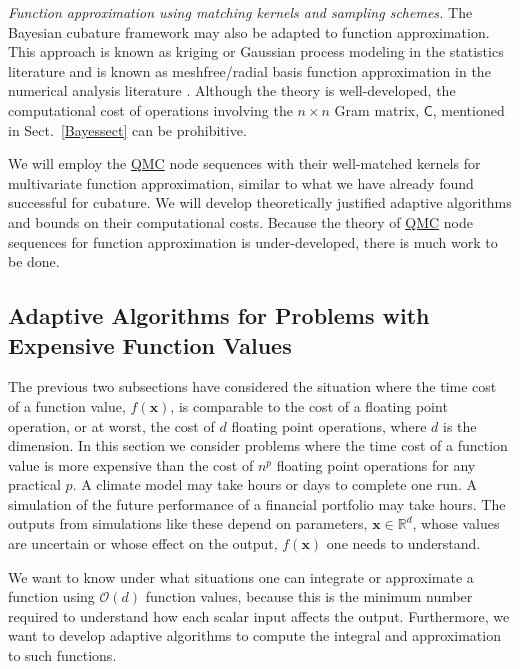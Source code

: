 \documentclass[11pt]{NSFamsart}
\newcommand{\QMC}{\hyperlink{QMClink}{QMC}\xspace}
\newcommand{\reals}{{\mathbb{R}}}
\newcommand{\mC}{\mathsf{C}}
\newcommand{\bx}{{\boldsymbol{x}}}
\newcommand{\Order}{\mathcal{O}}
\begin{document}
\emph{Function approximation using matching kernels and sampling schemes.}
The Bayesian cubature framework may also be adapted to function approximation.  This approach is 
known as kriging or Gaussian process modeling in the statistics literature \cite{RasWil06a,Ste99} 
and is known as meshfree/radial basis function 
approximation in the 
numerical analysis literature \cite{Fas07a,FasMcC15a,Wen05a}.  Although the theory is 
well-developed, the computational cost of operations involving the $n \times n$ Gram matrix, 
$\mC$, mentioned in Sect.\ \ref{Bayessect} can be prohibitive.  

We will employ the \QMC node sequences with their well-matched kernels for multivariate function 
approximation, similar to what  we 
have already found successful for cubature.  We will 
develop theoretically justified adaptive algorithms and bounds on their computational costs.  
Because the theory of \QMC node sequences for function approximation is under-developed, there 
is much work to be done.

\subsection{Adaptive Algorithms for Problems with Expensive Function Values} 
\label{SectExpensive}
The previous two subsections have considered the situation where the time cost of a function value, 
$f(\bx)$, is comparable to the cost of a floating point operation, or at worst, the cost of $d$ floating 
point 
operations, where $d$ is the dimension.  In this section we consider problems where the time cost 
of a function value is more expensive than the cost of $n^p$ floating point operations for any 
practical $p$.  A climate model may take hours or days to complete one run.  A simulation of the 
future performance of a financial portfolio may take hours.  The outputs from simulations like these 
depend on parameters, $\bx \in \reals^d$, whose values are uncertain or whose effect 
on the output, $f(\bx)$ one needs to understand.

We want to know under what situations one can integrate or approximate a function using 
$\Order(d)$ function values, because this is the minimum number required to understand how each 
scalar input affects the output.  Furthermore, we want to develop adaptive algorithms to compute 
the integral and approximation to such functions.
\end{document}
